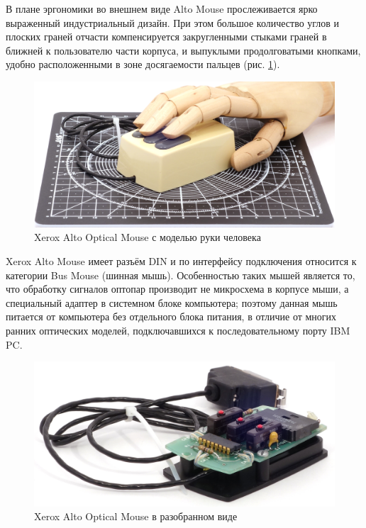 \documentclass[11pt, a4paper]{article}
\begin{document}
В плане эргономики во внешнем виде Alto Mouse прослеживается ярко выраженный индустриальный дизайн. При этом большое количество углов и плоских граней отчасти компенсируется закругленными стыками граней в ближней к пользователю части корпуса, и выпуклыми продолговатыми кнопками, удобно расположенными в зоне досягаемости пальцев (рис. \ref{fig:NecAltoHand}).

\begin{figure}[h]
    \centering
    \includegraphics[scale=0.4]{1981_xerox_alto_mouse/hand_30.jpg}
    \caption{Xerox Alto Optical Mouse с моделью руки человека}
    \label{fig:NecAltoHand}
\end{figure}

Xerox Alto Mouse имеет разъём DIN и по интерфейсу подключения относится к категории Bus Mouse (шинная мышь). Особенностью таких мышей является то, что обработку сигналов оптопар производит не микросхема в корпусе мыши, а специальный адаптер в системном блоке компьютера; поэтому данная мышь питается от компьютера без отдельного блока питания, в отличие от многих ранних оптических моделей, подключавшихся к последовательному порту IBM PC.

\begin{figure}[h]
    \centering
    \includegraphics[scale=0.8]{1981_xerox_alto_mouse/inside_60.jpg}
    \caption{Xerox Alto Optical Mouse в разобранном виде}
    \label{fig:NecAltoInside}
\end{figure}
\end{document}
